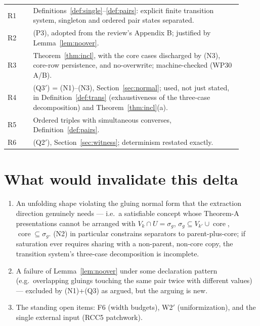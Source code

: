 \documentclass[11pt]{article}
\theoremstyle{definition}
\newcommand{\core}{\operatorname{core}}
\begin{document}
\begin{center}
\begin{tabular}{p{0.10\linewidth}p{0.82\linewidth}}
\toprule
R1 & Definitions~\ref{def:single}--\ref{def:pairs}: explicit finite
transition system, singleton and ordered pair states separated.\\
R2 & (P3), adopted from the review's Appendix B; justified by
Lemma~\ref{lem:noover}.\\
R3 & Theorem~\ref{thm:incl}, with the core cases discharged by (N3),
core-row persistence, and no-overwrite; machine-checked (WP30 A/B).\\
R4 & (Q3$'$) = (N1)--(N3), Section~\ref{sec:normal}; used, not just
stated, in Definition~\ref{def:trans} (exhaustiveness of the three-case
decomposition) and Theorem~\ref{thm:incl}(a).\\
R5 & Ordered triples with simultaneous converses,
Definition~\ref{def:pairs}.\\
R6 & (Q2$'$), Section~\ref{sec:witness}; determinism restated
exactly.\\
\bottomrule
\end{tabular}
\end{center}

\section{What would invalidate this delta}\label{sec:invalidate}

\begin{enumerate}[label=(Y\arabic*),leftmargin=2.6em]
\item An unfolding shape violating the gluing normal form that the
extraction direction genuinely needs --- i.e.\ a satisfiable concept
whose Theorem-A presentations cannot be arranged with
$V_k\cap U=\sigma_g$, $\sigma_g\subseteq V_{k'}\cup\core$,
$\core\subseteq\sigma_g$.  (N2) in particular constrains separators to
parent-plus-core; if saturation ever requires sharing with a
non-parent, non-core copy, the transition system's three-case
decomposition is incomplete.
\item A failure of Lemma~\ref{lem:noover} under some declaration
pattern (e.g.\ overlapping gluings touching the same pair twice with
different values) --- excluded by (N1)+(Q3) as argued, but the arguing
is new.
\item The standing open items: F6 (width budgets), W2$'$
(uniformization), and the single external input (RCC5 patchwork).
\end{enumerate}
\end{document}
